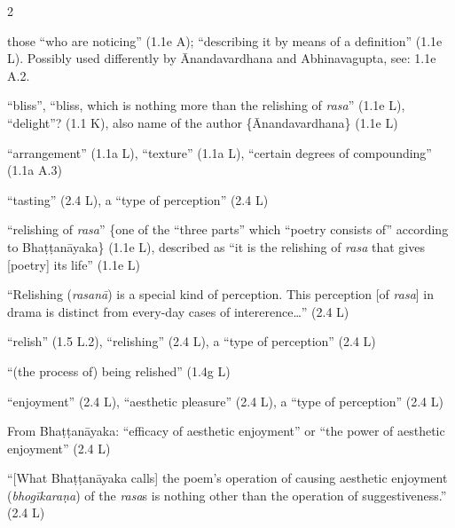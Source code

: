 \documentclass[10pt]{article}
\begin{document}
\begin{multicols}{2}
\begin{enumerate}[
			leftmargin=0em,
			rightmargin=0em,
		]
		 those ``who are noticing'' (1.1e A);
		``describing it by means of a definition'' (1.1e L).
		Possibly used differently by Ānandavardhana and Abhinavagupta, see: 1.1e A.2.

		 ``bliss'', ``bliss, which is nothing more than the relishing of \textit{rasa}'' (1.1e L),
		``delight''? (1.1 K),
		also name of the author \{Ānandavardhana\} (1.1e L)
		
		 ``arrangement'' (1.1a L), ``texture'' (1.1a L), ``certain degrees of compounding'' (1.1a A.3)



		 ``tasting'' (2.4 L),
		a ``type of perception'' (2.4 L)

		 ``relishing of \textit{rasa}'' \{one of the ``three parts'' which ``poetry consists of'' according to Bhaṭṭanāyaka\} (1.1e L),
		described as ``it is the relishing of \textit{rasa} that gives [poetry] its life'' (1.1e L)

		 ``Relishing (\textit{rasanā}) is a special kind of perception. This perception [of \textit{rasa}] in drama is distinct from every-day cases of intererence\dots'' (2.4 L)

		 ``relish'' (1.5 L.2),
		``relishing'' (2.4 L),
		a ``type of perception'' (2.4 L)

		 ``(the process of) being relished'' (1.4g L)

		 ``enjoyment'' (2.4 L),
		``aesthetic pleasure'' (2.4 L),
		a ``type of perception'' (2.4 L)

		 From Bhaṭṭanāyaka: ``efficacy of aesthetic enjoyment'' or ``the power of aesthetic enjoyment'' (2.4 L) 

		 ``[What Bhaṭṭanāyaka calls] the poem's operation of causing aesthetic enjoyment (\textit{bhogīkaraṇa}) of the \textit{rasa}s is nothing other than the operation of suggestiveness.'' (2.4 L)


\end{enumerate}
\end{multicols}
\end{document}
